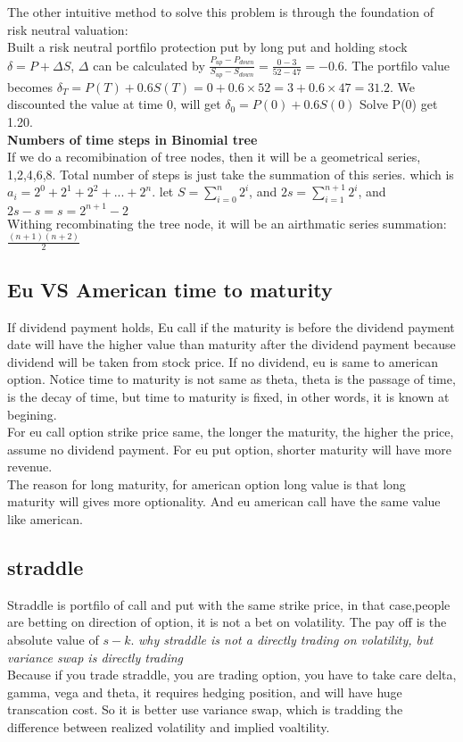 \documentclass[a4paper,11pt]{article}
\begin{document}
The other intuitive method to solve this problem is through the foundation of risk neutral valuation:\\
Built a risk neutral portfilo protection put by long put and holding stock $\delta=P+\Delta S$, $\Delta$ can be calculated by $\frac{P_{up}-P_{down}}{S_{up}-S_{down}}=\frac{0-3}{52-47}=-0.6$. The portfilo value becomes
$\delta_T=P(T)+0.6S(T)=0+0.6\times 52=3+0.6\times 47=31.2$. We discounted the value at time 0, will get $\delta_0=P(0)+0.6S(0)$ Solve P(0) get 1.20.\\
{\bf Numbers of time steps in Binomial tree}\\
If we do a recomibination of tree nodes, then it will be a geometrical series, 1,2,4,6,8. Total number of steps is just take the summation of this series. which is $a_i=2^0+2^1+2^2+...+2^n$. let $S=\sum\limits_{i=0}^n 2^i$, and $2s=\sum\limits_{i=1}^{n+1} 2^i$, and $2s-s=s=2^{n+1}-2$\\
Withing recombinating the tree node, it will be an airthmatic series summation:$\frac{(n+1)(n+2)}{2}$ \\

\subsection{Eu VS American time to maturity}
If dividend payment holds, Eu call if the maturity is before the dividend payment date will have the higher value than maturity after the dividend payment because dividend will be taken from stock price.
If no dividend, eu is same to american option. Notice time to maturity is not same as theta, theta is the passage of time, is the decay of time, but time to maturity is fixed, in other words, it is known at begining.\\
For eu call option strike price same, the longer the maturity, the higher the price, assume no dividend payment. For eu put option, shorter maturity will have more revenue.\\
The reason for long maturity, for american option long value is that long maturity will gives more optionality. And eu american call have the same value like american.
\subsection{straddle}
Straddle is portfilo of call and put with the same strike price, in that case,people are betting on direction of option, it is not a bet on volatility. The pay off is the absolute value of $s-k$.
{\em why straddle is not a directly trading on volatility, but variance swap is directly trading}\\
Because if you trade straddle, you are trading option, you have to take care delta, gamma, vega and theta, it requires hedging position, and will have huge transcation cost. So it is better use variance swap, which is tradding the difference between realized volatility and implied voaltility.\\
\end{document}
